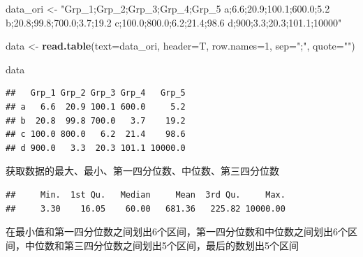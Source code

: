 \documentclass[]{article}
\newenvironment{Shaded}{\begin{snugshade}}{\end{snugshade}}
\newcommand{\KeywordTok}[1]{\textcolor[rgb]{0.13,0.29,0.53}{\textbf{{#1}}}}
\newcommand{\DataTypeTok}[1]{\textcolor[rgb]{0.13,0.29,0.53}{{#1}}}
\newcommand{\DecValTok}[1]{\textcolor[rgb]{0.00,0.00,0.81}{{#1}}}
\newcommand{\StringTok}[1]{\textcolor[rgb]{0.31,0.60,0.02}{{#1}}}
\newcommand{\NormalTok}[1]{{#1}}
\numberwithin{figure}{section}
\numberwithin{table}{section}
\theoremstyle{definition}
\theoremstyle{definition}
\theoremstyle{definition}
\theoremstyle{remark}
\begin{document}
\begin{Shaded}
\begin{Highlighting}[]
\NormalTok{data_ori <-}\StringTok{ "Grp_1;Grp_2;Grp_3;Grp_4;Grp_5}
\StringTok{a;6.6;20.9;100.1;600.0;5.2}
\StringTok{b;20.8;99.8;700.0;3.7;19.2}
\StringTok{c;100.0;800.0;6.2;21.4;98.6}
\StringTok{d;900;3.3;20.3;101.1;10000"}

\NormalTok{data <-}\StringTok{ }\KeywordTok{read.table}\NormalTok{(}\DataTypeTok{text=}\NormalTok{data_ori, }\DataTypeTok{header=}\NormalTok{T, }\DataTypeTok{row.names=}\DecValTok{1}\NormalTok{, }\DataTypeTok{sep=}\StringTok{";"}\NormalTok{, }\DataTypeTok{quote=}\StringTok{""}\NormalTok{)}

\NormalTok{data}
\end{Highlighting}
\end{Shaded}

\begin{verbatim}
##   Grp_1 Grp_2 Grp_3 Grp_4   Grp_5
## a   6.6  20.9 100.1 600.0     5.2
## b  20.8  99.8 700.0   3.7    19.2
## c 100.0 800.0   6.2  21.4    98.6
## d 900.0   3.3  20.3 101.1 10000.0
\end{verbatim}

获取数据的最大、最小、第一四分位数、中位数、第三四分位数

\begin{Shaded}
\end{Shaded}

\begin{verbatim}
##     Min.  1st Qu.   Median     Mean  3rd Qu.     Max. 
##     3.30    16.05    60.00   681.36   225.82 10000.00
\end{verbatim}

在最小值和第一四分位数之间划出6个区间，第一四分位数和中位数之间划出6个区间，中位数和第三四分位数之间划出5个区间，最后的数划出5个区间
\end{document}
